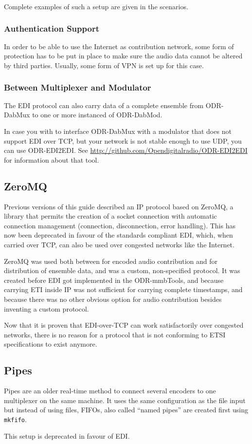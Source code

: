 Complete examples of such a setup are given in the scenarios.

\subsubsection{Authentication Support}
In order to be able to use the Internet as contribution network, some form of
protection has to be put in place to make sure the audio data cannot be altered
by third parties. Usually, some form of VPN is set up for this case.


\subsubsection{Between Multiplexer and Modulator}

The EDI protocol can also carry data of a complete ensemble from ODR-DabMux to
one or more instanced of ODR-DabMod.

In case you with to interface ODR-DabMux with a modulator that does not support
EDI over TCP, but your network is not stable enough to use UDP, you can use
ODR-EDI2EDI. See \url{http://github.com/Opendigitalradio/ODR-EDI2EDI} for
information about that tool.

\subsection{ZeroMQ}
\label{sec:zeromq}
Previous versions of this guide described an IP protocol based on
ZeroMQ, a library that permits the creation
of a socket connection with automatic connection management (connection,
disconnection, error handling). This has now been deprecated in favour of
the standards compliant EDI, which, when carried over TCP, can also be
used over congested networks like the Internet.

ZeroMQ was used both between for encoded audio contribution and for distribution
of ensemble data, and was a custom, non-specified protocol. It was created
before EDI got implemented in the ODR-mmbTools, and because carrying ETI inside
IP was not sufficient for carrying complete timestamps, and because there was no
other obvious option for audio contribution besides inventing a custom protocol.

Now that it is proven that EDI-over-TCP can work satisfactorily over congested
networks, there is no reason for a protocol that is not conforming to ETSI
specifications to exist anymore.

\subsection{Pipes}

Pipes are an older real-time method to connect several encoders to one
multiplexer on the same machine. It uses the same configuration as the file
input but instead of using files, FIFOs, also called ``named pipes'' are
created first using \texttt{mkfifo}.

This setup is deprecated in favour of EDI.


